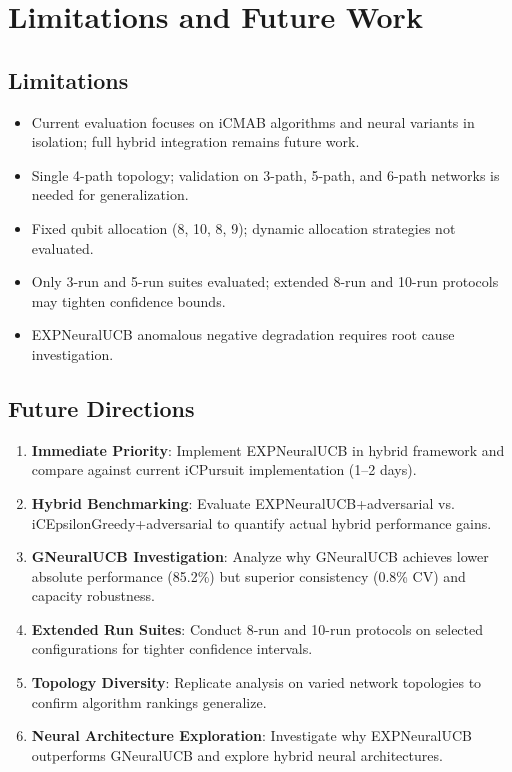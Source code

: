 \documentclass[12pt,a4paper]{article}
\begin{document}
\section{Limitations and Future Work}

\subsection{Limitations}
\begin{itemize}
\item Current evaluation focuses on iCMAB algorithms and neural variants in isolation; full hybrid integration remains future work.
\item Single 4-path topology; validation on 3-path, 5-path, and 6-path networks is needed for generalization.
\item Fixed qubit allocation (8, 10, 8, 9); dynamic allocation strategies not evaluated.
\item Only 3-run and 5-run suites evaluated; extended 8-run and 10-run protocols may tighten confidence bounds.
\item EXPNeuralUCB anomalous negative degradation requires root cause investigation.
\end{itemize}

\subsection{Future Directions}
\begin{enumerate}
\item \textbf{Immediate Priority}: Implement EXPNeuralUCB in hybrid framework and compare against current iCPursuit implementation (1--2 days).
\item \textbf{Hybrid Benchmarking}: Evaluate EXPNeuralUCB+adversarial vs. iCEpsilonGreedy+adversarial to quantify actual hybrid performance gains.
\item \textbf{GNeuralUCB Investigation}: Analyze why GNeuralUCB achieves lower absolute performance (85.2\%) but superior consistency (0.8\% CV) and capacity robustness.
\item \textbf{Extended Run Suites}: Conduct 8-run and 10-run protocols on selected configurations for tighter confidence intervals.
\item \textbf{Topology Diversity}: Replicate analysis on varied network topologies to confirm algorithm rankings generalize.
\item \textbf{Neural Architecture Exploration}: Investigate why EXPNeuralUCB outperforms GNeuralUCB and explore hybrid neural architectures.
\end{enumerate}
\end{document}
